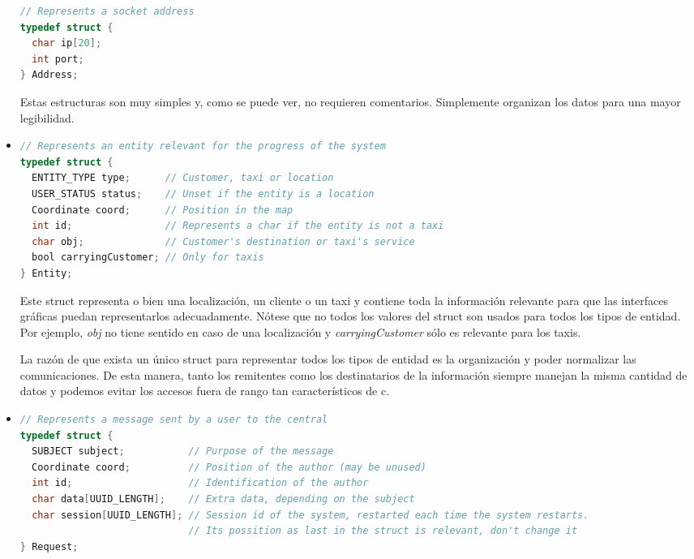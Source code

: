 \documentclass[a4paper,12pt]{article}
\begin{document}
\begin{itemize}
\begin{lstlisting}[language=C]
// Represents a socket address
typedef struct {
  char ip[20];
  int port;
} Address;
        \end{lstlisting}
        \par
        Estas estructuras son muy simples y, como se puede ver, no requieren comentarios. Simplemente organizan los datos para una mayor legibilidad.
  \item \begin{lstlisting}[language=C]
// Represents an entity relevant for the progress of the system
typedef struct {
  ENTITY_TYPE type;      // Customer, taxi or location
  USER_STATUS status;    // Unset if the entity is a location
  Coordinate coord;      // Position in the map
  int id;                // Represents a char if the entity is not a taxi
  char obj;              // Customer's destination or taxi's service
  bool carryingCustomer; // Only for taxis
} Entity;
        \end{lstlisting}
        Este struct representa o bien una localización, un cliente o un taxi y contiene toda la información relevante para que las interfaces gráficas
        puedan representarlos adecuadamente. Nótese que no todos los valores del struct son usados para todos los tipos de entidad. Por ejemplo,
        \textit{obj} no tiene sentido en caso de una localización y \textit{carryingCustomer} sólo es relevante para los taxis. \par
        La razón de que exista un único struct para representar todos los tipos de entidad es la organización y poder normalizar las comunicaciones.
        De esta manera, tanto los remitentes como los destinatarios de la información siempre manejan la misma cantidad de datos y podemos evitar los
        accesos fuera de rango tan característicos de c.
  \item \begin{lstlisting}[language=C]
// Represents a message sent by a user to the central
typedef struct {
  SUBJECT subject;           // Purpose of the message
  Coordinate coord;          // Position of the author (may be unused)
  int id;                    // Identification of the author
  char data[UUID_LENGTH];    // Extra data, depending on the subject
  char session[UUID_LENGTH]; // Session id of the system, restarted each time the system restarts.
                             // Its possition as last in the struct is relevant, don't change it
} Request;


\end{lstlisting}
\end{itemize}
\end{document}
